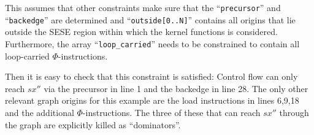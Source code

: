     \noindent
    This assumes that other constraints make sure that
    the ``\texttt{precursor}'' and ``\texttt{backedge}'' are determined and
    ``\texttt{outside[0..N]}'' contains
    all origins that lie outside the SESE region within which the kernel
    functions is considered.
    Furthermore, the array ``\texttt{loop\_carried}'' needs to be constrained to
    contain all loop-carried $\Phi$-instructions.

    Then it is easy to check that this constraint is satisfied:
    Control flow can only reach $sx''$ via the precursor in line 1 and the
    backedge in line 28.
    The only other relevant graph origins for this example are the load
    instructions in lines 6,9,18 and the additional $\Phi$-instructions.
    The three of these that can reach $sx''$ through the graph are explicitly
    killed as ``dominators''.


